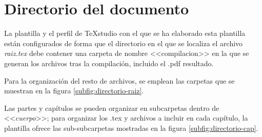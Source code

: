 \chapter{Directorio del documento}
La plantilla y el perfil de TeXstudio con el que se ha elaborado esta plantilla están configurados de forma que el directorio en el que se localiza el archivo \textit{raiz.tex} debe contener una carpeta de nombre <<compilacion>> en la que se generan los archivos tras la compilación, incluido el .pdf resultado.

Para la organización del resto de archivos, se emplean las carpetas que se muestran en la figura \ref{subfig:directorio-raiz}.

Las partes y capítulos se pueden organizar en subcarpetas dentro de <<\textit{cuerpo}>>; para organizar los .tex y archivos a incluir en cada capítulo, la plantilla ofrece las sub-subcarpetas mostradas en la  figura \ref{subfig:directorio-cap}.

